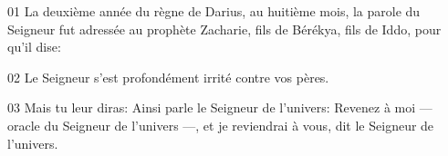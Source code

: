 01 La deuxième année du règne de Darius, au huitième mois, la parole du Seigneur fut adressée au prophète Zacharie, fils de Bérékya, fils de Iddo, pour qu’il dise:

02 Le Seigneur s’est profondément irrité contre vos pères.

03 Mais tu leur diras: Ainsi parle le Seigneur de l’univers: Revenez à moi --- oracle du Seigneur de l’univers ---, et je reviendrai à vous, dit le Seigneur de l’univers.
